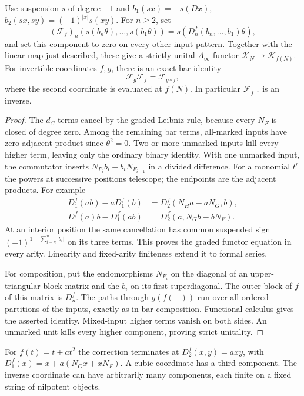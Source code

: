 \begin{theorem}\label{cyprim:thm:coordinate-functor}
Use suspension $s$ of degree $-1$ and
$b_1(sx)=-s(Dx)$, $b_2(sx,sy)=(-1)^{|x|}s(xy)$.
For $n\ge2$, set
\[
 (\mathcal F_f)_n(s(b_n\theta),\ldots,s(b_1\theta))
       =s(D_n^f(b_n,\ldots,b_1)\theta),
\]
and set this component to zero on every other input
pattern. Together with the linear map just described,
these give a strictly unital $A_\infty$ functor
$\mathcal K_N\to\mathcal K_{f(N)}$. For invertible
coordinates $f,g$, there is an exact bar identity
\[
 \mathcal F_g\mathcal F_f=\mathcal F_{g\circ f},
\]
where the second coordinate is evaluated at $f(N)$.
In particular $\mathcal F_{f^{-1}}$ is an inverse.
\end{theorem}

\begin{proof}
The $d_C$ terms cancel by the graded Leibniz rule,
because every $N_F$ is closed of degree zero.
Among the remaining bar terms, all-marked inputs
have zero adjacent product since $\theta^2=0$.
Two or more unmarked inputs kill every higher term,
leaving only the ordinary binary identity. With
one unmarked input, the commutator inserts
$N_{F_i}b_i-b_iN_{F_{i-1}}$ in a divided difference.
For a monomial $t^r$ the powers at successive positions
telescope; the endpoints are the adjacent products.
For example
\[
\begin{split}
 D_1^f(ab)-aD_1^f(b)&=D_2^f(N_Ha-aN_G,b),\\
 D_1^f(a)b-D_1^f(ab)&=D_2^f(a,N_Gb-bN_F).
\end{split}
\]
At an interior position the same cancellation has
common suspended sign
$(-1)^{1+\sum_{i=k}^n|b_i|}$ on its three terms.
This proves the graded functor equation in every
arity. Linearity and fixed-arity finiteness extend
it to formal series.

For composition, put the endomorphisms $N_{F_i}$ on
the diagonal of an upper-triangular block matrix
and the $b_i$ on its first superdiagonal. The outer
block of $f$ of this matrix is $D_n^f$. The paths
through $g(f(-))$ run over all ordered partitions
of the inputs, exactly as in bar composition.
Functional calculus gives the asserted identity.
Mixed-input higher terms vanish on both sides.
An unmarked unit kills every higher component,
proving strict unitality.
\end{proof}

For $f(t)=t+at^2$ the correction terminates at
$D_2^f(x,y)=axy$, with
$D_1^f(x)=x+a(N_Gx+xN_F)$. A cubic coordinate
has a third component. The inverse coordinate
can have arbitrarily many components, each finite
on a fixed string of nilpotent objects.


